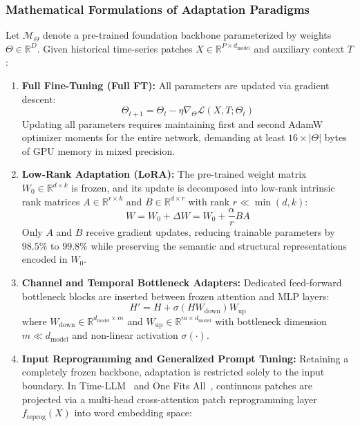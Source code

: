 \subsubsection{Mathematical Formulations of Adaptation Paradigms}
Let $\mathcal{M}_{\Theta}$ denote a pre-trained foundation backbone parameterized by weights $\Theta \in \mathbb{R}^{D}$. Given historical time-series patches $X \in \mathbb{R}^{P \times d_{\text{model}}}$ and auxiliary context $T$:
\begin{enumerate}
    \item \textbf{Full Fine-Tuning (Full FT):} All parameters are updated via gradient descent:
    \begin{equation}
        \Theta_{t+1} = \Theta_t - \eta \nabla_{\Theta} \mathcal{L}(X, T; \Theta_t)
    \end{equation}
    Updating all parameters requires maintaining first and second AdamW optimizer moments for the entire network, demanding at least $16 \times |\Theta|$ bytes of GPU memory in mixed precision.
    \item \textbf{Low-Rank Adaptation (LoRA):} The pre-trained weight matrix $W_0 \in \mathbb{R}^{d \times k}$ is frozen, and its update is decomposed into low-rank intrinsic rank matrices $A \in \mathbb{R}^{r \times k}$ and $B \in \mathbb{R}^{d \times r}$ with rank $r \ll \min(d, k)$:
    \begin{equation}
        W = W_0 + \Delta W = W_0 + \frac{\alpha}{r} B A
    \end{equation}
    Only $A$ and $B$ receive gradient updates, reducing trainable parameters by $98.5\%$ to $99.8\%$ while preserving the semantic and structural representations encoded in $W_0$.
    \item \textbf{Channel and Temporal Bottleneck Adapters:} Dedicated feed-forward bottleneck blocks are inserted between frozen attention and MLP layers:
    \begin{equation}
        H' = H + \sigma(H W_{\text{down}}) W_{\text{up}}
    \end{equation}
    where $W_{\text{down}} \in \mathbb{R}^{d_{\text{model}} \times m}$ and $W_{\text{up}} \in \mathbb{R}^{m \times d_{\text{model}}}$ with bottleneck dimension $m \ll d_{\text{model}}$ and non-linear activation $\sigma(\cdot)$.
    \item \textbf{Input Reprogramming and Generalized Prompt Tuning:} Retaining a completely frozen backbone, adaptation is restricted solely to the input boundary. In Time-LLM~\cite{Jin2023TimeLLM} and One Fits All~\cite{Zhou2023OneFitsAll}, continuous patches are projected via a multi-head cross-attention patch reprogramming layer $f_{\text{reprog}}(X)$ into word embedding space:

\end{enumerate}
